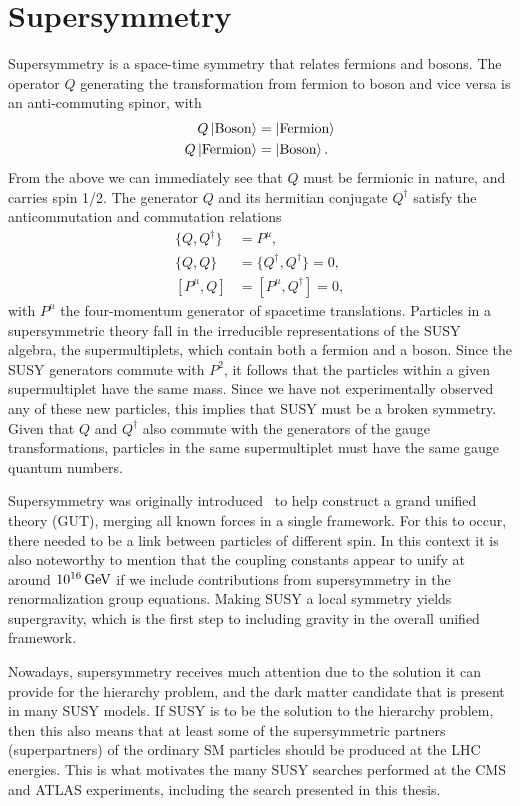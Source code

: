 \chapter{Supersymmetry \label{chap:supersymmetry}}

Supersymmetry is a space-time symmetry that relates fermions and bosons. The operator $Q$
generating the transformation from fermion to boson and vice versa is an anti-commuting spinor, with
\begin{align}
  Q \Ket{\textrm{Boson}} &= \Ket{\textrm{Fermion}} \\
  Q \Ket{\textrm{Fermion}} &= \Ket{\textrm{Boson}} .
\end{align}
From the above we can immediately see that $Q$ must be fermionic in nature, and carries spin 1/2. 
The generator $Q$ and its hermitian conjugate $Q^\dagger$ satisfy the anticommutation and
commutation relations
\begin{align}
  \{Q,Q^\dagger\} &= P^\mu ,\\
  \{Q,Q\} &= \{Q^\dagger,Q^\dagger\} = 0, \\
  \left[P^\mu,Q\right] &= \left[P^\mu,Q^\dagger\right] = 0 ,
\end{align}
with $P^\mu$ the four-momentum generator of spacetime translations. 
Particles in a supersymmetric theory fall in the irreducible representations of the SUSY algebra,
the supermultiplets, which contain both a fermion and a boson. 
Since the SUSY generators commute with $P^2$, it follows that the particles within a given
supermultiplet have the same mass. Since we have not experimentally observed any of these new
particles, this implies that SUSY must be a broken symmetry. 
Given that $Q$ and $Q^\dagger$ also commute with the generators of the gauge transformations, 
particles in the same supermultiplet must have the same gauge quantum numbers. 

Supersymmetry was originally introduced~\cite{Wess,Golfand,Chamseddine,Kane,Fayet,Barbieri,Hall} to
help construct a grand unified theory (GUT), merging all known forces in a single framework. For
this to occur, there needed to be a link between particles of different spin. In this context it is
also noteworthy to mention that the coupling constants appear to unify at around
$\text{10}^\text{16}\,\text{Ge\hspace{-.08em}V}$ if we include contributions from supersymmetry in the renormalization
group equations. Making SUSY a local symmetry yields supergravity, which is the first step to
including gravity in the overall unified framework. 

Nowadays, supersymmetry receives much attention due to the solution it can provide for the
hierarchy problem, and the dark matter candidate that is present in many SUSY models. If SUSY is to
be the solution to the hierarchy problem, then this also means that at least some of the
supersymmetric partners (superpartners) of the ordinary SM particles should be produced at the LHC
energies. This is what motivates the many SUSY searches performed at the CMS and ATLAS experiments,
including the search presented in this thesis. 

